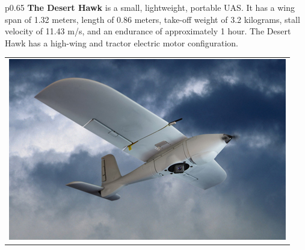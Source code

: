 \documentclass[]{article}
\begin{document}
\begin{table}[H]
\begin{minipage}[b]{0.65\linewidth}
\begin{tabular}{*{1}{p{0.65\textwidth}}}
{\bf The Desert Hawk} is a small, lightweight, portable UAS.  It has a wing span of 1.32 meters, length of 0.86 meters, take-off weight of 3.2 kilograms, stall velocity of 11.43 m/s, and an endurance of approximately 1 hour.  The Desert Hawk has a high-wing and tractor electric motor configuration.
\end{tabular}
\end{minipage}
\hfill
\begin{minipage}[b]{0.5\linewidth}
\begin{tabular}{*{1}{p{}}}
\includegraphics[height=8\baselineskip]{deserthawk}
\end{tabular}
\end{minipage}
\end{table}
\end{document}
